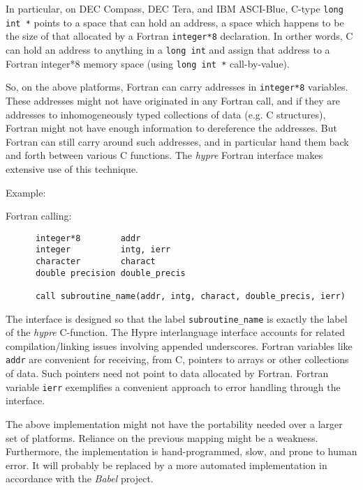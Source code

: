 \vspace{0.2in}

In particular, on DEC Compass, DEC Tera, and IBM ASCI-Blue, C-type
\verb+long int *+ points to a space that can hold an address, a space
which happens to be the size of that allocated by a Fortran
\verb+integer*8+ declaration.
In orther words, C can hold an address to anything in a \verb+long int+ and
assign that address to a Fortran integer*8 memory space (using \verb+long int *+ call-by-value).

So, on the above platforms, Fortran can carry addresses in \verb+integer*8+
variables.  These addresses might not have originated in any Fortran call,
and if they are addresses to inhomogeneously typed collections of data
(e.g. C structures), Fortran might not have enough information to dereference
the addresses.  But Fortran can still carry around such addresses, and in
particular hand them back and forth between various C functions.  The
{\slshape hypre} Fortran interface makes extensive use of this technique.

\vspace{0.1in}

\noindent Example:

\vspace{0.1in}

  Fortran calling:
\begin{verbatim}
      integer*8        addr
      integer          intg, ierr
      character        charact
      double precision double_precis

      call subroutine_name(addr, intg, charact, double_precis, ierr)
\end{verbatim}

The interface is designed so that the label \verb+subroutine_name+ is exactly
the label of the {\slshape hypre} C-function.  The {\slshape} Hypre interlanguage interface
accounts for related compilation/linking issues involving appended
underscores.  Fortran variables like \verb+addr+
are convenient for receiving, from C, pointers to arrays or other
collections of data.  Such pointers need not point to data allocated by Fortran.
Fortran variable \verb+ierr+ exemplifies a convenient approach to error
handling through the interface.

The above implementation might not have the portability needed over a larger set
of platforms.  Reliance on the previous mapping might be a weakness.
Furthermore,
the implementation is hand-programmed, slow, and prone to human error.
It will probably be replaced by a more automated implementation in accordance
with the {\slshape Babel} project. 

